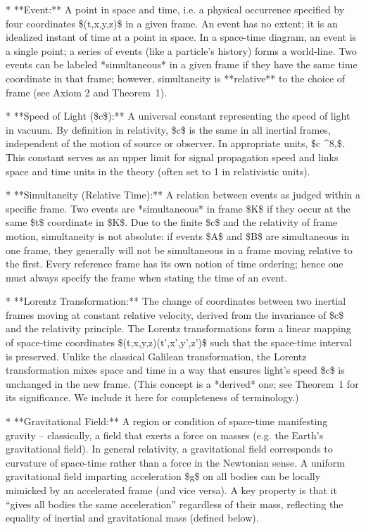 \documentclass{article}
\begin{document}
* **Event:** A point in space and time, i.e. a physical occurrence specified by four coordinates \$(t,x,y,z)\$ in a given frame. An event has no extent; it is an idealized instant of time at a point in space. In a space-time diagram, an event is a single point; a series of events (like a particle’s history) forms a world-line. Two events can be labeled *simultaneous* in a given frame if they have the same time coordinate in that frame; however, simultaneity is **relative** to the choice of frame (see Axiom 2 and Theorem 1).

* **Speed of Light (\$c\$):** A universal constant representing the speed of light in vacuum. By definition in relativity, \$c\$ is the same in all inertial frames, independent of the motion of source or observer. In appropriate units, \$c ^8,\$. This constant serves as an upper limit for signal propagation speed and links space and time units in the theory (often set to 1 in relativistic units).

* **Simultaneity (Relative Time):** A relation between events as judged within a specific frame. Two events are *simultaneous* in frame \$K\$ if they occur at the same \$t\$ coordinate in \$K\$. Due to the finite \$c\$ and the relativity of frame motion, simultaneity is not absolute: if events \$A\$ and \$B\$ are simultaneous in one frame, they generally will not be simultaneous in a frame moving relative to the first. Every reference frame has its own notion of time ordering; hence one must always specify the frame when stating the time of an event.

* **Lorentz Transformation:** The change of coordinates between two inertial frames moving at constant relative velocity, derived from the invariance of \$c\$ and the relativity principle. The Lorentz transformations form a linear mapping of space-time coordinates \$(t,x,y,z)\mapsto(t',x',y',z')\$ such that the space-time interval is preserved. Unlike the classical Galilean transformation, the Lorentz transformation mixes space and time in a way that ensures light’s speed \$c\$ is unchanged in the new frame. (This concept is a *derived* one; see Theorem 1 for its significance. We include it here for completeness of terminology.)

* **Gravitational Field:** A region or condition of space-time manifesting gravity – classically, a field that exerts a force on masses (e.g. the Earth’s gravitational field). In general relativity, a gravitational field corresponds to curvature of space-time rather than a force in the Newtonian sense. A uniform gravitational field imparting acceleration \$g\$ on all bodies can be locally mimicked by an accelerated frame (and vice versa). A key property is that it “gives all bodies the same acceleration” regardless of their mass, reflecting the equality of inertial and gravitational mass (defined below).
\end{document}
